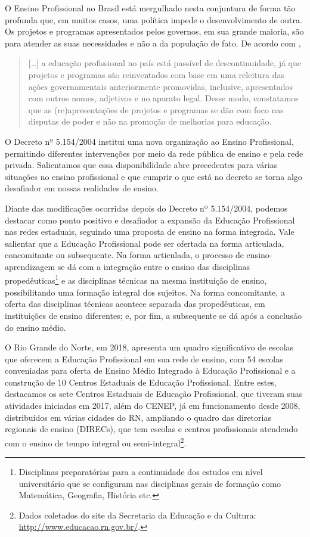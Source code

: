 \begin{refsection}
    O Ensino Profissional no Brasil está mergulhado nesta conjuntura de forma tão profunda que, em muitos casos, uma política impede o desenvolvimento de outra. Os projetos e programas apresentados pelos governos, em sua grande maioria, são para atender as suas necessidades e não a da população de fato. De acordo com \textcite[p.~3]{NASCIMENTOAndSILVA2017Políticas},  

    \begin{quotation}
        [\dots] a educação profissional no país está passível de descontinuidade, já que projetos e programas são reinventados com base em uma releitura das ações governamentais anteriormente promovidas, inclusive, apresentados com outros nomes, adjetivos e no aparato legal. Desse modo, constatamos que as (re)apresentações de projetos e programas se dão com foco nas disputas de poder e não na promoção de melhorias para educação.
    \end{quotation}


    O Decreto nº 5.154/2004 institui uma nova organização ao Ensino Profissional, permitindo diferentes intervenções por meio da rede pública de ensino e pela rede privada. Salientamos que essa disponibilidade abre precedentes para várias situações no ensino profissional e que cumprir o que está no decreto se torna algo desafiador em nossas realidades de ensino.  

    Diante das modificações ocorridas depois do Decreto nº 5.154/2004, podemos destacar como ponto positivo e desafiador a expansão da Educação Profissional nas redes estaduais, seguindo uma proposta de ensino na forma integrada. Vale salientar que a Educação Profissional pode ser ofertada na forma articulada, concomitante ou subsequente. Na forma articulada, o processo de ensino-aprendizagem se dá com a integração entre o ensino das disciplinas propedêuticas\footnote{Disciplinas preparatórias para a continuidade dos estudos em nível universitário que se configuram nas disciplinas gerais de formação como Matemática, Geografia, História etc.} e as disciplinas técnicas na mesma instituição de ensino, possibilitando uma formação integral dos sujeitos. Na forma concomitante, a oferta das disciplinas técnicas acontece separada das propedêuticas, em instituições de ensino diferentes; e, por fim, a subsequente se dá após a conclusão do ensino médio.  

    O Rio Grande do Norte, em 2018, apresenta um quadro significativo de escolas que oferecem a Educação Profissional em sua rede de ensino, com 54 escolas conveniadas para oferta de Ensino Médio Integrado à Educação Profissional e a construção de 10 Centros Estaduais de Educação Profissional. Entre estes, destacamos os sete Centros Estaduais de Educação Profissional, que tiveram suas atividades iniciadas em 2017, além do CENEP, já em funcionamento desde 2008, distribuídos em várias cidades do RN, ampliando o quadro das diretorias regionais de ensino (DIRECs), que tem escolas e centros profissionais atendendo com o ensino de tempo integral ou semi-integral\footnote{Dados coletados do site da Secretaria da Educação e da Cultura: \url{http://www.educacao.rn.gov.br/}.}.


\end{refsection}
